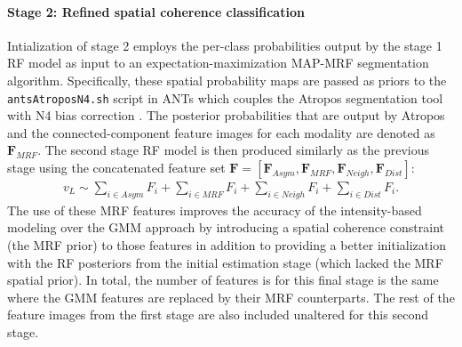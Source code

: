 

\paragraph{Stage 2:  Refined spatial coherence classification}
Intialization of stage 2 employs the per-class probabilities output
by the stage 1 RF model as input to an expectation-maximization MAP-MRF 
segmentation algorithm.  
 Specifically, these spatial probability maps are passed as priors to the
{\tt antsAtroposN4.sh} script in ANTs which couples the Atropos 
segmentation tool \citep{avants2011} with N4 bias correction \citep{tustison2010}.
The posterior probabilities that are output by Atropos and the
connected-component feature images for each modality  are denoted as $\bm{F}_{MRF}$.    
The second stage RF model is then produced similarly as the previous stage
using the concatenated feature set $\bm{F}= [ \bm{F}_{Asym}, \bm{F}_{MRF},
\bm{F}_{Neigh}, \bm{F}_{Dist} ]$: 
\begin{align}
\label{eq:mapmrf}
 v_L \sim \sum_{i \in Asym} F_i + \sum_{i \in MRF} F_i + \sum_{i \in Neigh} F_i + \sum_{i \in Dist} F_i.
\end{align}
The use of these MRF features improves the accuracy of the 
intensity-based modeling over the GMM approach by introducing
a spatial coherence constraint (the MRF prior) to those features 
in addition to 
providing a better initialization with the RF posteriors from 
the initial estimation stage (which lacked the MRF spatial prior).  
In total, the number of features is for this final stage is the same
where the GMM features are replaced by their MRF counterparts.
The rest of the feature images from the first stage are also included unaltered for this second stage.

